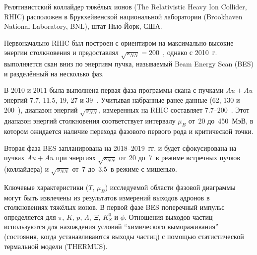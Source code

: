 
Релятивистский коллайдер тяжёлых ионов (The Relativistic Heavy Ion Collider, RHIC) расположен в Брукхейвенской национальной лаборатории (Brookhaven National Laboratory, BNL), штат Нью-Йорк, США. 

Первоначально RHIC был построен с ориентиром на максимально высокие энергии столкновения и предоставлял $\sqrt{s_{NN}}=200$~\GeV, однако с 2010~г. выполняется скан вниз по энергиям пучка, называемый Beam Energy Scan (BES) и разделённый на несколько фаз.



В 2010 и 2011 была выполнена первая фаза программы скана с пучками $Au+Au$ энергий 7.7, 11.5, 19, 27 и 39~\GeV. Учитывая набранные ранее данные (62, 130 и 200~\GeV), диапазон энергий $\sqrt{s_{NN}}$, измеренных на RHIC составляет 7.7--200~\GeV. Этот диапазон энергий столкновения соответствует интервалу $\mu_{B}$ от~20 до~450~МэВ, в котором ожидается наличие перехода фазового первого рода и критической точки.

Вторая фаза BES запланирована на 2018--2019~гг. и будет сфокусирована на пучках $Au+Au$ при энергиях $\sqrt{s_{NN}}$ от~20 до~7~\GeV в режиме встречных пучков (коллайдера\todo) и $\sqrt{s_{NN}}$ от~7 до~3.5~\GeV в режиме с мишенью.





Ключевые характеристики ($T$, $\mu_{B}$) исследуемой области фазовой диаграммы могут быть извлечены из результатов измерений выходов адронов в столкновениях тяжёлых ионов. В первой фазе BES поперечный импульс определяется для $\pi$, $K$, $p$, $\Lambda$, $\Xi$, $K^{0}_{S}$ и $\phi$. Отношения выходов частиц используются для нахождения условий ``химического вымораживания'' (состояния, когда устанавливаются выходы частиц) с помощью статистической термальной модели (THERMUS).

